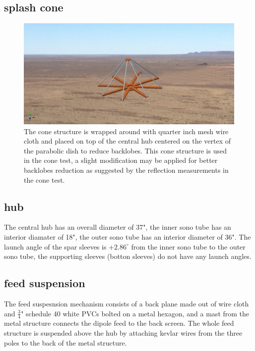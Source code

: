 \documentclass[preprint]{aastex}  %
\begin{document}
\subsection{splash cone}
\begin{figure}[H]
	\begin{center}
	\includegraphics[width =\textwidth]{./dish_plots/splashAssembly}
	\caption{The cone structure is wrapped around with quarter inch mesh wire cloth and placed on top of the central hub centered on the vertex of the parabolic dish to reduce backlobes. This cone structure is used in the cone test, a slight modification may be applied for better backlobes reduction as suggested by the reflection measurements in the cone test. 
\label{Fig:splashcone} }
	\end{center}
\end{figure}
\clearpage

\subsection{hub}
The central hub has an overall diameter of 37", the inner sono tube has an interior diamater of 18", the outer sono tube has an interior diameter of 36". The launch angle of the spar sleeves is $+2.86^{\circ}$ from the inner sono tube to the outer sono tube, the supporting sleeves (botton sleeves) do not have any launch angles.


\subsection {feed suspension}
The feed suspesnsion mechanism consists of a back plane made out of wire cloth and $\frac{3}{4}$" schedule 40 white PVCs bolted on a metal hexagon, and a mast from the metal structure connects the dipole feed to the back screen. The whole feed structure is suspended above the hub by attaching kevlar wires from the three poles to the back of the metal structure. 
\end{document}
